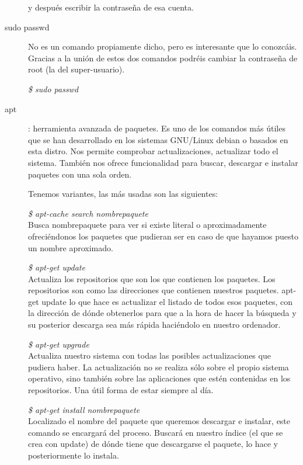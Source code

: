 \documentclass[12pt,spanish,lettersize,twocolumn]{article}
\begin{document}
\begin{description}
y despu\'es escribir la contrase\~na de esa cuenta.

\item[sudo passwd]
No es un comando propiamente dicho, pero es interesante que lo conozc\'ais. Gracias a la uni\'on de estos dos comandos podr\'eis cambiar la contrase\~na de root (la del super-usuario).

\emph{\$ sudo passwd}\\

\item[apt]: herramienta avanzada de paquetes. Es uno de los comandos m\'as útiles que se han desarrollado en los sistemas GNU/Linux debian o basados en esta distro. Nos permite comprobar actualizaciones, actualizar todo el sistema. Tambi\'en nos ofrece funcionalidad para buscar, descargar e instalar paquetes con una sola orden.

Tenemos variantes, las m\'as usadas son las siguientes:

\emph{\$ apt-cache search nombrepaquete}\\

Busca nombrepaquete para ver si existe literal o aproximadamente ofreci\'endonos los paquetes que pudieran ser en caso de que hayamos puesto un nombre aproximado.

\emph{\$ apt-get update}\\

Actualiza los repositorios que son los que contienen los paquetes. Los repositorios son como las direcciones que contienen nuestros paquetes. apt-get update lo que hace es actualizar el listado de todos esos paquetes, con la direcci\'on de d\'onde obtenerlos para que a la hora de hacer la búsqueda y su posterior descarga sea m\'as r\'apida haci\'endolo en nuestro ordenador.

\emph{\$ apt-get upgrade}\\

Actualiza nuestro sistema con todas las posibles actualizaciones que pudiera haber. La actualizaci\'on no se realiza s\'olo sobre el propio sistema operativo, sino tambi\'en sobre las aplicaciones que est\'en contenidas en los repositorios. Una útil forma de estar siempre al d\'ia.

\emph{\$ apt-get install nombrepaquete}\\

Localizado el nombre del paquete que queremos descargar e instalar, este comando se encargar\'a del proceso. Buscar\'a en nuestro \'indice (el que se crea con update) de d\'onde tiene que descargarse el paquete, lo hace y posteriormente lo instala.


\end{description}
\end{document}
